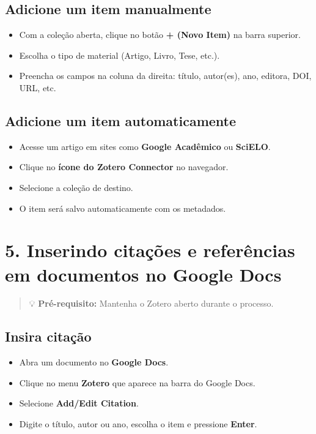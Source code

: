 \documentclass[
  letterpaper,
  DIV=11,
  numbers=noendperiod]{scrreprt}
\providecommand{\tightlist}{%
  \setlength{\itemsep}{0pt}\setlength{\parskip}{0pt}}
\begin{document}
\subsection{Adicione um item
manualmente}\label{adicione-um-item-manualmente}

\begin{itemize}
\tightlist
\item
  Com a coleção aberta, clique no botão \textbf{+ (Novo Item)} na barra
  superior.
\item
  Escolha o tipo de material (Artigo, Livro, Tese, etc.).
\item
  Preencha os campos na coluna da direita: título, autor(es), ano,
  editora, DOI, URL, etc.
\end{itemize}

\subsection{Adicione um item
automaticamente}\label{adicione-um-item-automaticamente}

\begin{itemize}
\tightlist
\item
  Acesse um artigo em sites como \textbf{Google Acadêmico} ou
  \textbf{SciELO}.
\item
  Clique no \textbf{ícone do Zotero Connector} no navegador.
\item
  Selecione a coleção de destino.
\item
  O item será salvo automaticamente com os metadados.
\end{itemize}

\section{5. Inserindo citações e referências em documentos no Google
Docs}\label{inserindo-citauxe7uxf5es-e-referuxeancias-em-documentos-no-google-docs}

\begin{quote}
💡 \textbf{Pré-requisito:} Mantenha o Zotero aberto durante o processo.
\end{quote}

\subsection{Insira citação}\label{insira-citauxe7uxe3o}

\begin{itemize}
\tightlist
\item
  Abra um documento no \textbf{Google Docs}.
\item
  Clique no menu \textbf{Zotero} que aparece na barra do Google Docs.
\item
  Selecione \textbf{Add/Edit Citation}.
\item
  Digite o título, autor ou ano, escolha o item e pressione
  \textbf{Enter}.
\end{itemize}
\end{document}
